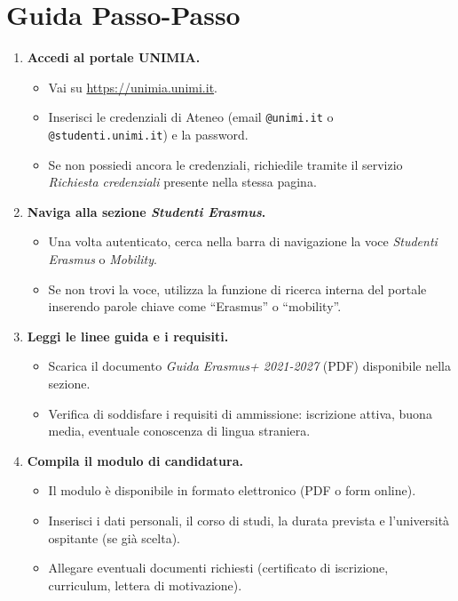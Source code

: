 \documentclass{article}
\begin{document}
\section{Guida Passo-Passo}
\begin{enumerate}[label=\arabic*.]
    \item \textbf{Accedi al portale UNIMIA.}  
    \begin{itemize}
        \item Vai su \href{https://unimia.unimi.it}{https://unimia.unimi.it}.  
        \item Inserisci le credenziali di Ateneo (email \texttt{@unimi.it} o \texttt{@studenti.unimi.it}) e la password.  
        \item Se non possiedi ancora le credenziali, richiedile tramite il servizio \textit{Richiesta credenziali} presente nella stessa pagina.
    \end{itemize}
    \item \textbf{Naviga alla sezione \textit{Studenti Erasmus}.}  
    \begin{itemize}
        \item Una volta autenticato, cerca nella barra di navigazione la voce \textit{Studenti Erasmus} o \textit{Mobility}.  
        \item Se non trovi la voce, utilizza la funzione di ricerca interna del portale inserendo parole chiave come ``Erasmus'' o ``mobility''.
    \end{itemize}
    \item \textbf{Leggi le linee guida e i requisiti.}  
    \begin{itemize}
        \item Scarica il documento \textit{Guida Erasmus+ 2021-2027} (PDF) disponibile nella sezione.  
        \item Verifica di soddisfare i requisiti di ammissione: iscrizione attiva, buona media, eventuale conoscenza di lingua straniera.
    \end{itemize}
    \item \textbf{Compila il modulo di candidatura.}  
    \begin{itemize}
        \item Il modulo è disponibile in formato elettronico (PDF o form online).  
        \item Inserisci i dati personali, il corso di studi, la durata prevista e l'università ospitante (se già scelta).  
        \item Allegare eventuali documenti richiesti (certificato di iscrizione, curriculum, lettera di motivazione).

\end{itemize}
\end{enumerate}
\end{document}
